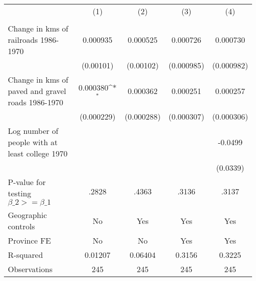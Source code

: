 {
\def\sym#1{\ifmmode^{#1}\else\(^{#1}\)\fi}
\begin{tabular}{l*{4}{c}}
\hline\hline
                &\multicolumn{1}{c}{(1)}&\multicolumn{1}{c}{(2)}&\multicolumn{1}{c}{(3)}&\multicolumn{1}{c}{(4)}\\
                &\multicolumn{1}{c}{}&\multicolumn{1}{c}{}&\multicolumn{1}{c}{}&\multicolumn{1}{c}{}\\
\hline
Change in kms of railroads 1986-1970& 0.000935         & 0.000525         & 0.000726         & 0.000730         \\
                &(0.00101)         &(0.00102)         &(0.000985)         &(0.000982)         \\
[1em]
Change in kms of paved and gravel roads 1986-1970& 0.000380\sym{*}  & 0.000362         & 0.000251         & 0.000257         \\
                &(0.000229)         &(0.000288)         &(0.000307)         &(0.000306)         \\
[1em]
Log number of people with at least college 1970&                  &                  &                  &  -0.0499         \\
                &                  &                  &                  & (0.0339)         \\
\hline
P-value for testing $\beta\_{2} >= \beta\_{1}$&    .2828         &    .4363         &    .3136         &    .3137         \\
Geographic controls&       No         &      Yes         &      Yes         &      Yes         \\
Province FE     &       No         &       No         &      Yes         &      Yes         \\
R-squared       &  0.01207         &  0.06404         &   0.3156         &   0.3225         \\
Observations    &      245         &      245         &      245         &      245         \\
\hline\hline
\end{tabular}
}
